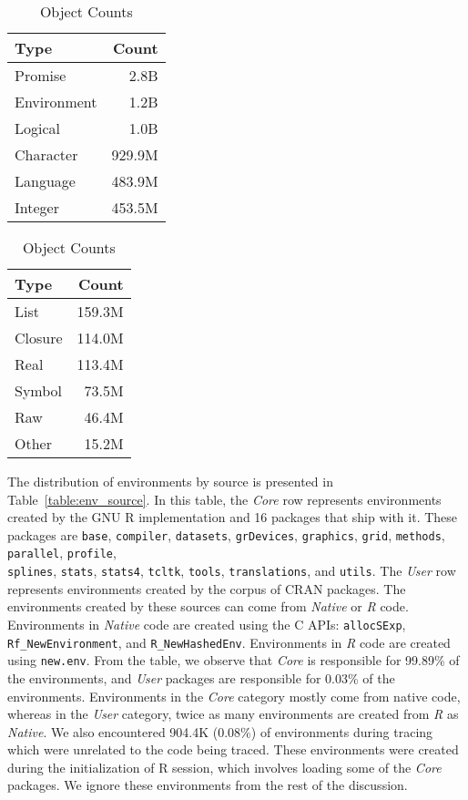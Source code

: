 \documentclass[10pt,review,sigplan,anonymous=true,authorversion=true,nonacm=true]{acmart}
\newcommand{\code}[1]{\lstinline |#1|\xspace}
\newcommand{\newEnv}{\code{new.env}}
\begin{document}
\begin{table}
  \vspace{-3mm}
  \small
  \caption{Object Counts} \label{table:object_count_dist}
  \centering
  \begin{tabular}{lr}
    \toprule
    \textbf{Type}&\textbf{Count}\\
    \midrule
    Promise&2.8B\\
    Environment&1.2B\\
    Logical&1.0B\\
    Character&929.9M\\
    Language&483.9M\\
    Integer&453.5M\\
    \bottomrule
  \end{tabular}
  \begin{tabular}{lr}
    \toprule
    \textbf{Type}&\textbf{Count}\\
    \midrule
    List&159.3M\\
    Closure&114.0M\\
    Real&113.4M\\
    Symbol&73.5M\\
    Raw&46.4M\\
    Other&15.2M\\
    \bottomrule
  \end{tabular}
\end{table}

The distribution of environments by source is presented in
Table~\ref{table:env_source}. In this table, the \emph{Core} row represents
environments created by the GNU R implementation and 16 packages that ship with
it. These packages are \code{base}, \code{compiler}, \code{datasets},
\code{grDevices}, \code{graphics}, \code{grid}, \code{methods},
\code{parallel}, \code{profile}, \\\code{splines}, \code{stats},
\code{stats4}, \code{tcltk}, \code{tools}, \code{translations}, and
\code{utils}. The \emph{User} row represents environments created by the
corpus of CRAN packages. The environments created by these sources can come from
\emph{Native} or \emph{R} code. Environments in \emph{Native} code are created
using the C APIs: \code{allocSExp}, \\\code{Rf_NewEnvironment}, and
\code{R_NewHashedEnv}. Environments in \emph{R} code are created using \newEnv.
From the table, we observe that \emph{Core} is responsible for 99.89\% of the
environments, and \emph{User} packages are responsible for 0.03\% of the
environments. Environments in the \emph{Core} category mostly come from native
code, whereas in the \emph{User} category, twice as many environments are
created from \emph{R} as \emph{Native}. We also encountered 904.4K (0.08\%) of
environments during tracing which were unrelated to the code being traced. These
environments were created during the initialization of R session, which involves
loading some of the \emph{Core} packages. We ignore these environments from the
rest of the discussion.
\end{document}
